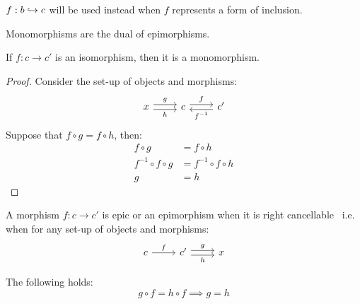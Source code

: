\begin{remark}
  $f:b\hookrightarrow c$ will be used instead when $f$ represents a form of inclusion.
\end{remark}

\begin{remark}
  Monomorphisms are the dual of epimorphisms.
\end{remark}

\begin{theorem}
  If $f:c\to c'$ is an isomorphism, then it is a monomorphism.

  \begin{proof}
    Consider the set-up of objects and morphisms:
    \[\begin{tikzcd}[ampersand replacement=\&]
      x \& c \& {c'}
      \arrow["f", shift left=1, from=1-2, to=1-3]
      \arrow["g", shift left=1, from=1-1, to=1-2]
      \arrow["h"', shift right=1, from=1-1, to=1-2]
      \arrow["{f^{-1}}", shift left=1, from=1-3, to=1-2]
    \end{tikzcd}\]
    Suppose that $f\circ g = f\circ h$, then:
    \[
      \begin{aligned}
        f\circ g &= f\circ h\\
        f^{-1}\circ f\circ g &= f^{-1}\circ f\circ h\\
        g &= h
      \end{aligned}
    \]
  \end{proof}
\end{theorem}

\begin{definition}
  A morphism $f:c\to c'$ is epic or an epimorphism when it is right
  cancellable~\parencite{lane:working_mathematician} i.e. when for any set-up of
  objects and morphisms:
  \[\begin{tikzcd}[ampersand replacement=\&]
    c \& {c'} \& x
    \arrow["h"', shift right=1, from=1-2, to=1-3]
    \arrow["f", from=1-1, to=1-2]
    \arrow["g", shift left=1, from=1-2, to=1-3]
  \end{tikzcd}\]

  The following holds:
  \[g \circ f = h \circ f \implies g = h\]
\end{definition}

